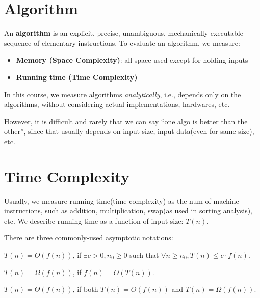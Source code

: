 
\begin{spacing}{1.3}
    
    \section{Algorithm}

    An \textbf{algorithm} is an explicit, precise, unambiguous, mechanically-executable
    sequence of elementary instructions. To evaluate an algorithm, we measure:
    \begin{itemize}
        \item {\bf Memory (Space Complexity)}: 
        all space used except for holding inputs
        \item {\bf Running time (Time Complexity)}  
    \end{itemize}

    In this course, we measure algorithms {\it analytically}, i.e., 
    depends only on the algorithms, without considering actual
    implementations, hardwares, etc. 

    However, it is difficult and rarely that we can say
    ``one algo is better than the other'', since that usually 
    depends on input size, input data(even for same size), etc.

    \section{Time Complexity}

    Usually, we measure running time(time complexity) as the num
    of machine instructions, such as addition, multiplication,
    swap(as used in sorting analysis), etc. We describe running time
    as a function of input size: $T(n)$.

    There are three commonly-used asymptotic notations:
    \begin{definition}
        $T(n)=O(f(n))$, if
            $\exists c>0, n_0\ge 0$ such that 
            $\forall n\ge n_0, T(n)\le c\cdot f(n)$.
    \end{definition}
    \begin{definition}
        $T(n)=\Omega(f(n))$, if $f(n)=O(T(n))$.
    \end{definition}
    \begin{definition}
        $T(n)=\Theta(f(n))$, if both $T(n)=O(f(n))$ and $T(n)=\Omega (f(n))$.
    \end{definition}


\end{spacing}
